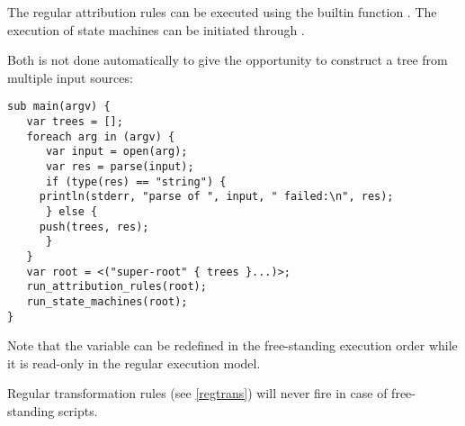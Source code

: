 The regular attribution rules can be executed using the builtin function
.
The execution of state machines can be initiated through
.

Both is not done automatically to give the opportunity to construct a
tree from multiple input sources:

\begin{lstlisting}
sub main(argv) {
   var trees = [];
   foreach arg in (argv) {
      var input = open(arg);
      var res = parse(input);
      if (type(res) == "string") {
	 println(stderr, "parse of ", input, " failed:\n", res);
      } else {
	 push(trees, res);
      }
   }
   var root = <("super-root" { trees }...)>;
   run_attribution_rules(root);
   run_state_machines(root);
}
\end{lstlisting}

\noindent
Note that the variable  can be redefined in
the free-standing execution order while it is read-only
in the regular execution model.

Regular transformation rules (see \ref{regtrans})
will never fire in case of free-standing scripts.

\endinput
